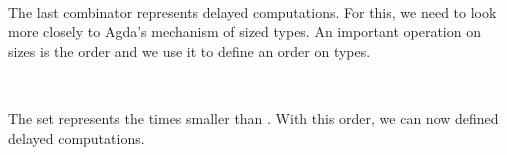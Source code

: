 \begin{code}%
\>[0]\AgdaSpace{}%
\AgdaSymbol{:}\AgdaSpace{}%
\AgdaSymbol{(}\AgdaSpace{}%
\AgdaSpace{}%
\AgdaSpace{}%
\AgdaSpace{}%
\AgdaSymbol{)}\<%
\\
\>[0]\AgdaSpace{}%
\AgdaSymbol{\{}\AgdaSymbol{\}}\AgdaSpace{}%
\AgdaSpace{}%
\AgdaSpace{}%
\AgdaSymbol{=}\AgdaSpace{}%
\AgdaSpace{}%
\AgdaSpace{}%
\<%
\end{code}

The last combinator represents delayed computations.
For this, we need to look more closely to Agda's mechanism of sized types.
An important operation on sizes is the order and we use it to define an order on types.

\begin{code}%
\>[0]\AgdaSpace{}%
\AgdaSymbol{:}\AgdaSpace{}%
\AgdaSpace{}%
\AgdaSpace{}%
\<%
\\
\>[0]\AgdaSpace{}%
\AgdaSpace{}%
\AgdaSymbol{=}\AgdaSpace{}%
\AgdaSpace{}%
\<%
\end{code}

The set   represents the times smaller than .
With this order, we can now defined delayed computations.

\begin{code}%
\>[0]\AgdaSpace{}%
\AgdaSpace{}%
\AgdaSymbol{(}\AgdaSpace{}%
\AgdaSymbol{:}\AgdaSpace{}%
\AgdaSymbol{)}\AgdaSpace{}%
\AgdaSymbol{(}\AgdaSpace{}%
\AgdaSymbol{:}\AgdaSpace{}%
\AgdaSymbol{)}\AgdaSpace{}%
\AgdaSymbol{:}\AgdaSpace{}%
\AgdaSpace{}%
\<%
\\
\>[0][@{}l@{\AgdaIndent{0}}]%
\>[2]\<%
\\
%
\>[2]\AgdaSpace{}%
\AgdaSpace{}%
\AgdaSymbol{:}\AgdaSpace{}%
\AgdaSymbol{\{}\AgdaSpace{}%
\AgdaSymbol{:}\AgdaSpace{}%
\AgdaSpace{}%
\AgdaSymbol{\}}\AgdaSpace{}%
\AgdaSpace{}%
\AgdaSpace{}%
\<%
\\
\>[0]\AgdaSpace{}%
\AgdaSpace{}%
\<%
\end{code}

